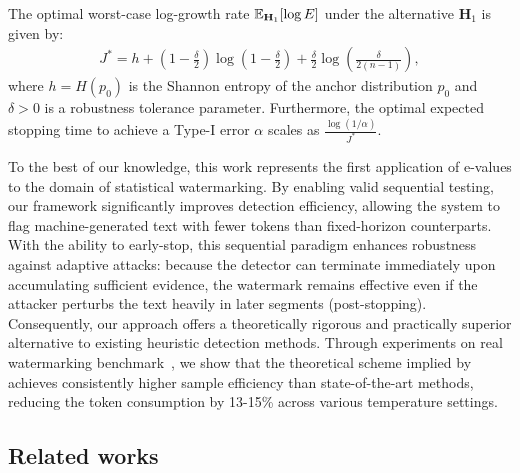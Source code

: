 \begin{theorem}\label{thm:informal}
The optimal worst-case log-growth rate $\mathbb{E}_{\mathbf{H}_1}[\log E]$ under the alternative $\mathbf{H}_1$ is given by:
\begin{align*}
    J^* = h + \left(1-\frac{\delta}{2}\right)\log\left(1-\frac{\delta}{2}\right)
 + \frac{\delta}{2}\log\left(\frac{\delta}{2(n-1)}\right),
\end{align*}
where $h = H(p_0)$ is the Shannon entropy of the anchor distribution $p_0$ and $\delta>0$ is a robustness tolerance parameter.
Furthermore, the optimal expected stopping time to achieve a Type-I error $\alpha$ scales as $\frac{\log(1/\alpha)}{J^*}$.
\end{theorem}

To the best of our knowledge, this work represents the first application of e-values to the domain of statistical watermarking. By enabling valid sequential testing, our framework significantly improves detection efficiency, allowing the system to flag machine-generated text with fewer tokens than fixed-horizon counterparts. With the ability to early-stop, this sequential paradigm enhances robustness against adaptive attacks: because the detector can terminate immediately upon accumulating sufficient evidence, the watermark remains effective even if the attacker perturbs the text heavily in later segments (post-stopping). Consequently, our approach offers a theoretically rigorous and practically superior alternative to existing heuristic detection methods. Through experiments on real watermarking benchmark~\citep{piet2023mark}, we show that the theoretical scheme implied by  achieves consistently higher sample efficiency than state-of-the-art methods, reducing the token consumption by 13-15\% across various temperature settings.

\subsection{Related works}

\label{sec:related_work}

